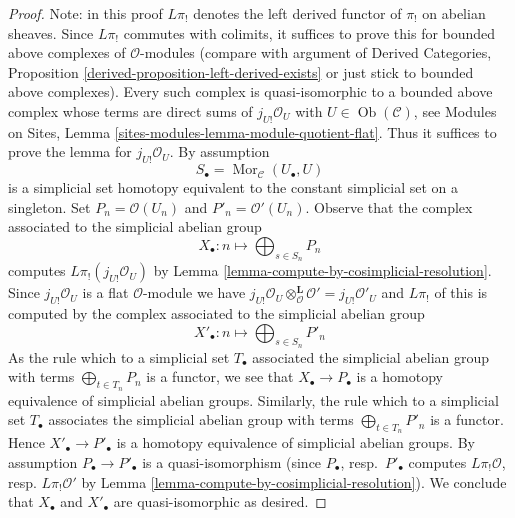 \documentclass[10pt,a4paper]{amsart}
\theoremstyle{plain}
\theoremstyle{definition}
\theoremstyle{remark}
\numberwithin{equation}{subsection}
\def\Mor{\mathop{\mathrm{Mor}}\nolimits}
\def\Ob{\mathop{\mathrm{Ob}}\nolimits}
\begin{document}
\begin{proof}
Note: in this proof $L\pi_!$ denotes the left derived functor
of $\pi_!$ on abelian sheaves.
Since $L\pi_!$ commutes with colimits, it suffices
to prove this for bounded above complexes of $\mathcal{O}$-modules
(compare with argument of
Derived Categories, Proposition \ref{derived-proposition-left-derived-exists}
or just stick to bounded above complexes).
Every such complex is quasi-isomorphic to a bounded above complex
whose terms are direct sums of $j_{U!}\mathcal{O}_U$ with
$U \in \Ob(\mathcal{C})$, see
Modules on Sites, Lemma \ref{sites-modules-lemma-module-quotient-flat}.
Thus it suffices to prove the lemma
for $j_{U!}\mathcal{O}_U$. By assumption
$$
S_\bullet = \Mor_\mathcal{C}(U_\bullet, U)
$$
is a simplicial set homotopy equivalent to the constant simplicial
set on a singleton. Set $P_n = \mathcal{O}(U_n)$ and
$P'_n = \mathcal{O}'(U_n)$. Observe that the complex associated to the
simplicial abelian group
$$
X_\bullet : n \longmapsto \bigoplus\nolimits_{s \in S_n} P_n
$$
computes $L\pi_!(j_{U!}\mathcal{O}_U)$ by
Lemma \ref{lemma-compute-by-cosimplicial-resolution}.
Since $j_{U!}\mathcal{O}_U$ is a flat $\mathcal{O}$-module we have
$j_{U!}\mathcal{O}_U \otimes^\mathbf{L}_\mathcal{O} \mathcal{O}' =
j_{U!}\mathcal{O}'_U$ and $L\pi_!$ of this is computed by the complex
associated to the simplicial abelian group
$$
X'_\bullet : n \longmapsto \bigoplus\nolimits_{s \in S_n} P'_n
$$
As the rule which to a simplicial set $T_\bullet$ associated the simplicial
abelian group with terms $\bigoplus_{t \in T_n} P_n$ is a functor, we see
that $X_\bullet \to P_\bullet$ is a homotopy equivalence of simplicial
abelian groups. Similarly, the rule which to a simplicial set
$T_\bullet$ associates the simplicial abelian group with terms
$\bigoplus_{t \in T_n} P'_n$ is a functor. Hence $X'_\bullet \to P'_\bullet$
is a homotopy equivalence of simplicial abelian groups.
By assumption $P_\bullet \to P'_\bullet$ is a quasi-isomorphism
(since $P_\bullet$, resp.\ $P'_\bullet$ computes $L\pi_!\mathcal{O}$,
resp. $L\pi_!\mathcal{O}'$ by
Lemma \ref{lemma-compute-by-cosimplicial-resolution}).
We conclude that $X_\bullet$ and $X'_\bullet$ are quasi-isomorphic as desired.
\end{proof}
\end{document}
